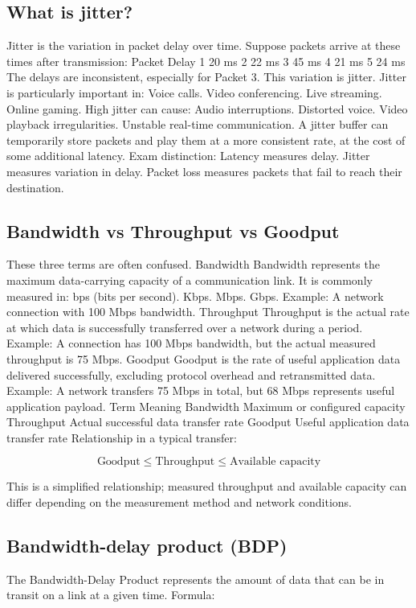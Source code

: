 \subsection{What is jitter?}
Jitter is the variation in packet delay over time.
Suppose packets arrive at these times after transmission:
Packet
Delay
1
20 ms
2
22 ms
3
45 ms
4
21 ms
5
24 ms
The delays are inconsistent, especially for Packet 3.
This variation is jitter.
Jitter is particularly important in:
Voice calls.
Video conferencing.
Live streaming.
Online gaming.
High jitter can cause:
Audio interruptions.
Distorted voice.
Video playback irregularities.
Unstable real-time communication.
A jitter buffer can temporarily store packets and play them at a more consistent rate, at the cost of some additional latency.
Exam distinction:
Latency measures delay.
Jitter measures variation in delay.
Packet loss measures packets that fail to reach their destination.
\subsection{Bandwidth vs Throughput vs Goodput}
These three terms are often confused.
Bandwidth
Bandwidth represents the maximum data-carrying capacity of a communication link.
It is commonly measured in:
bps (bits per second).
Kbps.
Mbps.
Gbps.
Example: A network connection with 100 Mbps bandwidth.
Throughput
Throughput is the actual rate at which data is successfully transferred over a network during a period.
Example:
A connection has 100 Mbps bandwidth, but the actual measured throughput is 75 Mbps.
Goodput
Goodput is the rate of useful application data delivered successfully, excluding protocol overhead and retransmitted data.
Example:
A network transfers 75 Mbps in total, but 68 Mbps represents useful application payload.
Term
Meaning
Bandwidth
Maximum or configured capacity
Throughput
Actual successful data transfer rate
Goodput
Useful application data transfer rate
Relationship in a typical transfer:

\[
\text{Goodput}\leq\text{Throughput}\leq\text{Available capacity}
\]

This is a simplified relationship; measured throughput and available capacity can differ depending on the measurement method and network conditions.
\subsection{Bandwidth-delay product (BDP)}
The Bandwidth-Delay Product represents the amount of data that can be in transit on a link at a given time.
Formula:

